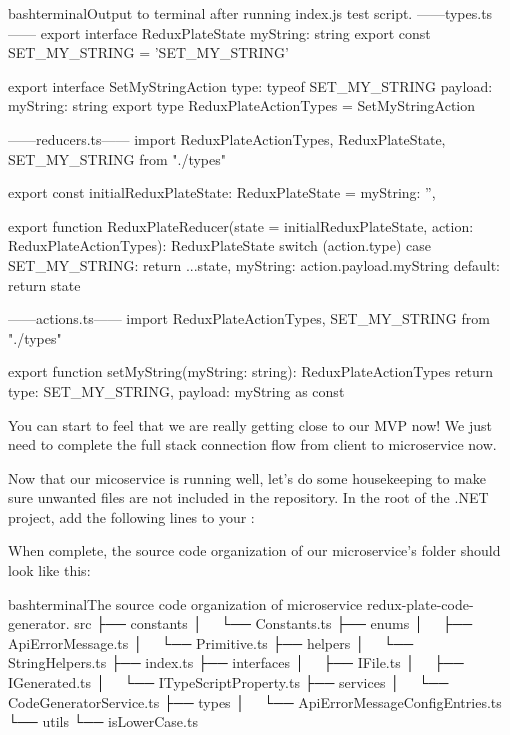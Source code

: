\documentclass[paper=6in:9in,pagesize=pdftex,headinclude=on,footinclude=on,12pt,twoside]{scrbook}
\begin{document}
\begin{codeInput}{bash}{terminal}{Output to terminal after running index.js test script.}
------types.ts------
export interface ReduxPlateState {
    myString: string
}
export const SET_MY_STRING = 'SET_MY_STRING'

export interface SetMyStringAction {
  type: typeof SET_MY_STRING
  payload: {
    myString: string
  }
}
export type ReduxPlateActionTypes = SetMyStringAction

------reducers.ts------
import { ReduxPlateActionTypes, ReduxPlateState, SET_MY_STRING } from "./types"

export const initialReduxPlateState: ReduxPlateState = {
  myString: '',
}

export function ReduxPlateReducer(state = initialReduxPlateState, action: ReduxPlateActionTypes): ReduxPlateState {
  switch (action.type) {
    case SET_MY_STRING:
      return {
        ...state,
        myString: action.payload.myString
      }
    default:
      return state
  }
}

------actions.ts------
import { ReduxPlateActionTypes, SET_MY_STRING } from "./types"

export function setMyString(myString: string): ReduxPlateActionTypes {
  return {
    type: SET_MY_STRING,
    payload: {
      myString
    }
  } as const
}
\end{codeInput}

You can start to feel that we are really getting close to our MVP now! \wink We just need to complete the full stack connection flow from client to microservice now.


Now that our micoservice is running well, let's do some housekeeping to make sure unwanted files are not included in the repository. In the root of the .NET project, add the following lines to your :




When complete, the source code organization of our microservice's  folder should look like this:

\begin{codeInput}{bash}{terminal}{The source code organization of microservice redux-plate-code-generator.}
src
├── constants
│   └── Constants.ts
├── enums
│   ├── ApiErrorMessage.ts
│   └── Primitive.ts
├── helpers
│   └── StringHelpers.ts
├── index.ts
├── interfaces
│   ├── IFile.ts
│   ├── IGenerated.ts
│   └── ITypeScriptProperty.ts
├── services
│   └── CodeGeneratorService.ts
├── types
│   └── ApiErrorMessageConfigEntries.ts
└── utils
    └── isLowerCase.ts
\end{codeInput}
\end{document}
